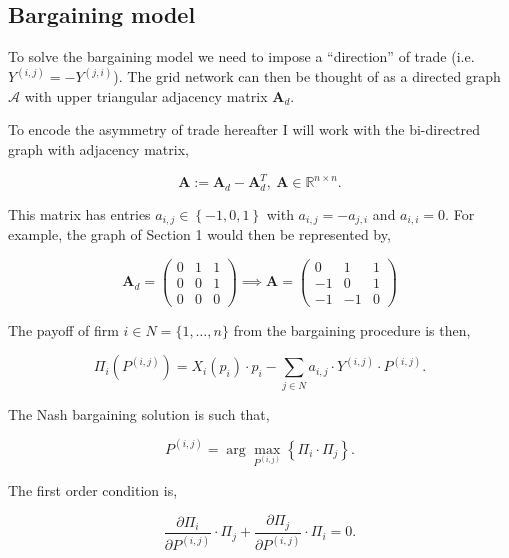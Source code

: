 \documentclass[american]{scrartcl}
\newcommand{\R}{\mathbb{R}}
\newcommand{\matr}[1]{\bm{#1}}
\newcommand{\set}[1]{\left\{#1\right\}}
\begin{document}
\subsection{Bargaining model}

To solve the bargaining model we need to impose a ``direction'' of trade (i.e. $Y^{(i, j)} = - Y^{(j, i)}$). The grid network can then be thought of as a directed graph $\mathcal{A}$ with upper triangular adjacency matrix $\matr{A}_{d}$.

To encode the asymmetry of trade hereafter I will work with the bi-directred graph with adjacency matrix,

\begin{equation}
	\matr{A} := \matr{A}_{d} - \matr{A}_{d}^T,  \ \matr{A} \in\R^{n\times n}.
\end{equation}

This matrix has entries $a_{i, j} \in \set{-1, 0, 1}$ with $a_{i, j} = - a_{j, i}$ and $a_{i, i} = 0$. For example, the graph of Section 1 would then be represented by,

\begin{equation}
	\matr{A}_d= \begin{pmatrix}
		0 & 1 & 1 \\
		0 & 0 & 1 \\
		0 & 0 & 0
	\end{pmatrix} \implies
	\matr{A} = \begin{pmatrix}
		0 & 1 & 1 \\
		-1 & 0 & 1 \\
		-1 & -1 & 0
	\end{pmatrix}
\end{equation}

The payoff of firm $i \in N = \{1, \ldots, n\}$ from the bargaining procedure is then,

\begin{equation}
	\Pi_i\left( P^{(i, j)} \right) = X_i(p_i)\cdot p_i - \sum_{j \in N} a_{i, j} \cdot Y^{(i, j)} \cdot P^{(i, j)}.
\end{equation}

The Nash bargaining solution is such that,

\begin{equation}
	P^{(i, j)} = \arg \max_{P^{(i, j)}} \left\{\Pi_i \cdot \Pi_j \right\}.
\end{equation}

The first order condition is,

\begin{equation}
	\frac{\partial\Pi_i}{\partial P^{(i, j)}} \cdot \Pi_j + \frac{\partial\Pi_j}{\partial P^{(i, j)}} \cdot \Pi_i = 0.
\end{equation}
\end{document}
